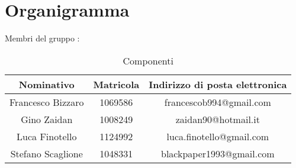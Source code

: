 \section{Organigramma}


Membri del gruppo \GRUPPO:
\begin{table}[h]
\centering
\bgroup
\def\arraystretch{1.6}
	\begin{tabular}{| c | c | c |}
		\hline 
		\rowcolor{LightCyan}
		\textbf{Nominativo} & \textbf{Matricola} & \textbf{Indirizzo di posta 
		elettronica} \\ \hline \hline 
		Francesco Bizzaro & 1069586 & francescob994@gmail.com  \\ \hline  
		Gino Zaidan & 1008249 & zaidan90@hotmail.it  \\ \hline 
		Luca Finotello & 1124992 & luca.finotello@gmail.com \\ \hline
		Stefano Scaglione & 1048331 & blackpaper1993@gmail.com  \\ \hline
	\end{tabular}
\egroup
\caption{Componenti}
\end{table}
